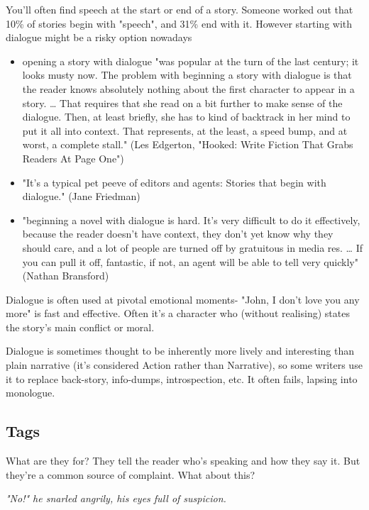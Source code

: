 \documentclass[11pt]{article}
\newenvironment{narrow}[2]{%
 \begin{list}{}{%
  \setlength{\topsep}{0pt}%
  \setlength{\leftmargin}{#1}%
  \setlength{\rightmargin}{#2}%
  \setlength{\listparindent}{\parindent}%
  \setlength{\itemindent}{\parindent}%
  \setlength{\parsep}{\parskip}%
 }%
\item[]}{\end{list}}
\begin{document}
You'll often find speech at the start or end of a story. Someone worked out that
10\% of stories begin with "speech", and 31\% end with it. However starting with dialogue might be a risky option nowadays
\begin{itemize}
\item  opening a story with dialogue "was popular at the turn of the last century; it looks musty now. The problem with beginning a story with dialogue is that the reader knows absolutely nothing about the first character to appear in a story. … That requires that she read on a bit further to make sense of the dialogue. Then, at least briefly, she has to kind of backtrack in her mind to put it all into context. That represents, at the least, a speed bump, and at worst, a complete stall." (Les Edgerton, "Hooked: Write Fiction That Grabs Readers At Page One")

\item 
"It’s a typical pet peeve of editors and agents: Stories that begin with dialogue." (Jane Friedman) 

\item "beginning a novel with dialogue is hard. It's very difficult to do it effectively, because the reader doesn't have context, they don't yet know why they should care, and a lot of people are turned off by gratuitous in media res. … If you can pull it off, fantastic, if not, an agent will be able to tell very quickly" (Nathan Bransford)
\end{itemize}

Dialogue is often used at pivotal emotional moments- "John, I don't love you any more" is fast and effective. Often it's a character who (without realising) states the story's main conflict or moral. 



Dialogue is sometimes thought to be inherently more lively and interesting than plain narrative (it's considered Action rather than Narrative), so some writers use it to replace back-story, info-dumps, introspection, etc. It often fails, lapsing into monologue.



\subsection*{Tags}
What are they for? They tell the reader who's speaking and how they say it. But they're a common source of complaint. What about this? 

\begin{narrow}{1.0cm}{1.0cm}
   \textit{"No!" he snarled angrily, his eyes full of suspicion.}
\end{narrow}
\end{document}

